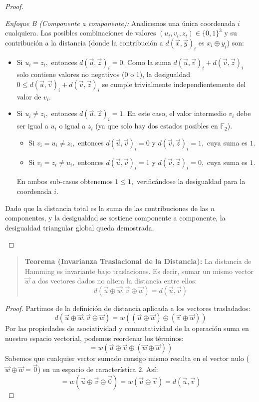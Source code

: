 \begin{proof}
\begin{enumerate}
    \textit{Enfoque B (Componente a componente):}
    Analicemos una única coordenada $i$ cualquiera. Las posibles combinaciones de valores $(u_i, v_i, z_i) \in \{0, 1\}^3$ y su contribución a la distancia (donde la contribución a $d(\vec{x}, \vec{y})_i$ es $x_i \oplus y_i$) son:
    \begin{itemize}
        \item Si $u_i = z_i,$ entonces $d(\vec{u}, \vec{z})_i = 0.$ Como la suma $d(\vec{u}, \vec{v})_i + d(\vec{v}, \vec{z})_i$ solo contiene valores no negativos (0 o 1), la desigualdad $0 \le d(\vec{u}, \vec{v})_i + d(\vec{v}, \vec{z})_i$ se cumple trivialmente independientemente del valor de $v_i.$
        \item Si $u_i \ne z_i,$ entonces $d(\vec{u}, \vec{z})_i = 1.$ En este caso, el valor intermedio $v_i$ debe ser igual a $u_i$ o igual a $z_i$ (ya que solo hay dos estados posibles en $\mathbb{F}_2$). 
        \begin{itemize}
            \item Si $v_i = u_i \ne z_i,$ entonces $d(\vec{u}, \vec{v})_i = 0$ y $d(\vec{v}, \vec{z})_i = 1,$ cuya suma es $1.$
            \item Si $v_i = z_i \ne u_i,$ entonces $d(\vec{u}, \vec{v})_i = 1$ y $d(\vec{v}, \vec{z})_i = 0,$ cuya suma es $1.$
        \end{itemize}
        En ambos sub-casos obtenemos $1 \le 1,$ verificándose la desigualdad para la coordenada $i.$
    \end{itemize}
    Dado que la distancia total es la suma de las contribuciones de las $n$ componentes, y la desigualdad se sostiene componente a componente, la desigualdad triangular global queda demostrada.
\end{enumerate}
\end{proof}

\begin{quote}\textbf{Teorema (Invarianza Traslacional de la Distancia):}\label{inv_traslacional}
La distancia de Hamming es invariante bajo traslaciones. Es decir, sumar un mismo vector $\vec{w}$ a dos vectores dados no altera la distancia entre ellos:
\[ d(\vec{u} \oplus \vec{w}, \vec{v} \oplus \vec{w}) = d(\vec{u}, \vec{v}) \]
\end{quote}
\begin{proof}
Partimos de la definición de distancia aplicada a los vectores trasladados:
\[ d(\vec{u} \oplus \vec{w}, \vec{v} \oplus \vec{w}) = w((\vec{u} \oplus \vec{w}) \oplus (\vec{v} \oplus \vec{w})) \]
Por las propiedades de asociatividad y conmutatividad de la operación suma en nuestro espacio vectorial, podemos reordenar los términos:
\[ = w(\vec{u} \oplus \vec{v} \oplus (\vec{w} \oplus \vec{w})) \]
Sabemos que cualquier vector sumado consigo mismo resulta en el vector nulo ($\vec{w} \oplus \vec{w} = \vec{0}$) en un espacio de característica $2.$ Así:
\[ = w(\vec{u} \oplus \vec{v} \oplus \vec{0}) = w(\vec{u} \oplus \vec{v}) = d(\vec{u}, \vec{v}) \]
\end{proof}

